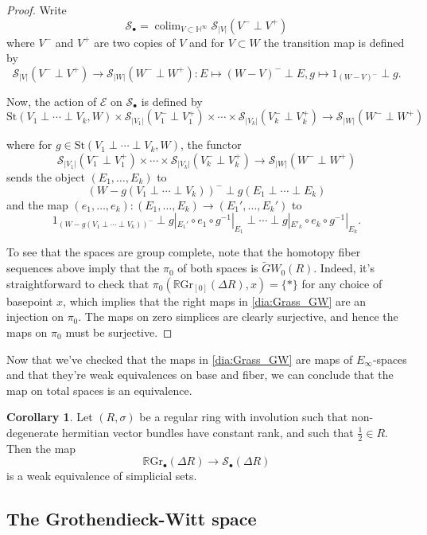 \documentclass[draftthesis,tocnosub,noragright,centerchapter,10pt]{uiucthesis2009}
\newcommand{\mbb}{\mathbb}
\newcommand{\mc}{\mathcal}
\newcommand{\RGr}{\mathbb R\mathrm{Gr}}
\newcommand{\St}{\mathrm{St}}
\DeclareMathOperator*{\colim}{colim}
\theoremstyle{plain}
\theoremstyle{definition}
\newtheorem{corollary}[lemma]{Corollary}
\begin{document}
\begin{proof}
Write
\[
\mc S_\bullet = \colim_{V \subset \mbb H^\infty} \mc S_{|V|}(V^- \perp V^+)
\]
where $V^-$ and $V^+$ are two copies of $V$ and for $V \subset W$ the
transition map is defined by
\[
\mc S_{|V|}(V^- \perp V^+) \rightarrow \mc S_{|W|}(W^- \perp W^+) : E
\mapsto (W-V)^- \perp E, g \mapsto 1_{(W-V)^-} \perp g.
\]

Now, the action of $\mathscr E$ on $\mc S_\bullet$ is defined by
\[
\St(V_1 \perp \cdots \perp V_k,W) \times \mc S_{|V_1|}(V_1^- \perp
V_1^+) \times \cdots \times \mc S_{|V_k|}(V_k^- \perp V_k^+)
\rightarrow \mc S_{|W|}(W^- \perp W^+)
\]

where for $g \in \St(V_1 \perp \cdots \perp V_k,W)$, the functor
\[
\mc S_{|V_1|}(V_1^- \perp V_1^+) \times \cdots \times \mc
S_{|V_k|}(V_k^- \perp V_k^+) \rightarrow \mc S_{|W|}(W^- \perp W^+)
\]
sends the object $(E_1,\dots,E_k)$ to 
\[
(W - g(V_1\perp \cdots \perp V_k))^- \perp g(E_1 \perp \cdots \perp E_k)
\]
and the map $(e_1,\dots,e_k): (E_1,\dots,E_k) \rightarrow
(E_1',\dots,E_k')$ to
\[
1_{(W - g(V_1 \perp \cdots \perp V_k))^-} \perp g|_{E_1'} \circ e_1
\circ g^{-1}|_{E_1} \perp \cdots \perp g|_{E'_k} \circ e_k \circ g^{-1}|_{E_k}.
\]

To see that the spaces are group complete, note that the homotopy
fiber sequences above imply that the $\pi_0$ of both spaces is
$\widetilde GW_0(R)$. Indeed, it's straightforward to check that
$\pi_0(\RGr_{[0]}(\Delta R),x) = \{\ast\}$ for any choice of basepoint
$x$, which implies that the right
maps in \ref{dia:Grass_GW} are an injection on $\pi_0$. The maps on
zero simplices are clearly surjective, and hence the maps on $\pi_0$
must be surjective. 
\end{proof}

Now that we've checked that the maps in \ref{dia:Grass_GW} are maps of
$E_\infty$-spaces and that they're weak equivalences on base and
fiber, we can conclude that the map on total spaces is an equivalence.

\begin{corollary}
Let $(R,\sigma)$ be a regular ring with involution such that
non-degenerate hermitian vector bundles have constant rank, and such
that $\frac{1}{2} \in R$. Then the map
\[
\RGr_\bullet(\Delta R) \rightarrow \mc S_\bullet(\Delta R)
\]
is a weak equivalence of simplicial sets.
\end{corollary}



\subsection{The Grothendieck-Witt space}
\end{document}
